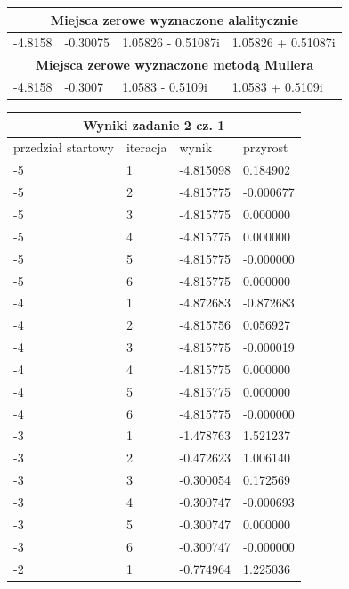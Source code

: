 \documentclass[a4paper, 11pt]{article}
\begin{document}
\begin{table}[H]
\centering
\label{my-label}
\begin{tabular}{|l|l|l|l|}
\hline
\multicolumn{4}{|c|}{\textbf{Miejsca zerowe wyznaczone alalitycznie}} \\ \hline
-4.8158 & -0.30075 & 1.05826 - 0.51087i & 1.05826 + 0.51087i \\ \hline
\multicolumn{4}{|c|}{\textbf{Miejsca zerowe wyznaczone metodą Mullera}} \\ \hline
-4.8158 & -0.3007 & 1.0583 - 0.5109i & 1.0583 + 0.5109i \\ \hline
\end{tabular}
\end{table}

\begin{table}[H]
\centering
\label{my-label}
\begin{tabular}{|l|l|l|l|}
\hline
\multicolumn{4}{|c|}{\textbf{Wyniki zadanie 2 cz. 1}} \\ \hline
\multicolumn{1}{|c|}{przedział startowy} & iteracja & wynik & przyrost \\ \hline
-5 & 1 & -4.815098 & 0.184902 \\ \hline
-5 & 2 & -4.815775 & -0.000677 \\ \hline
-5 & 3 & -4.815775 & 0.000000 \\ \hline
-5 & 4 & -4.815775 & 0.000000 \\ \hline
-5 & 5 & -4.815775 & -0.000000 \\ \hline
-5 & 6 & -4.815775 & 0.000000 \\ \hline
-4 & 1 & -4.872683 & -0.872683 \\ \hline
-4 & 2 & -4.815756 & 0.056927 \\ \hline
-4 & 3 & -4.815775 & -0.000019 \\ \hline
-4 & 4 & -4.815775 & 0.000000 \\ \hline
-4 & 5 & -4.815775 & 0.000000 \\ \hline
-4 & 6 & -4.815775 & -0.000000 \\ \hline
-3 & 1 & -1.478763 & 1.521237 \\ \hline
-3 & 2 & -0.472623 & 1.006140 \\ \hline
-3 & 3 & -0.300054 & 0.172569 \\ \hline
-3 & 4 & -0.300747 & -0.000693 \\ \hline
-3 & 5 & -0.300747 & 0.000000 \\ \hline
-3 & 6 & -0.300747 & -0.000000 \\ \hline
-2 & 1 & -0.774964 & 1.225036 \\ \hline

\end{tabular}
\end{table}
\end{document}
